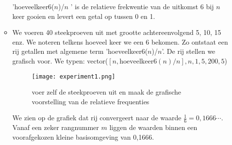 \begin{small}
\begin{itemize}
\begin{itemize}
'hoeveelkeer6($n$)/$n$ ' is de relatieve frekwentie van de uitkomst 6 bij $n$ keer gooien en levert een getal op tussen 0 en 1.
\item We voeren 40 steekproeven uit met grootte achtereenvolgend 5, 10, 15 enz. We noteren telkens hoeveel keer we een 6 bekomen. Zo ontstaat een rij getallen met algemene term 'hoeveelkeer6($n$)/$n$'. De rij stellen we grafisch voor.
We typen:
\bderive vector($[n,\mbox{hoeveelkeer}6(n)/n],n,1,5,200,5$)\ederive 
\begin{figure}[h]
\begin{center}
\texttt{[image: experiment1.png]}
\parbox{\textwidth}{\caption{voer zelf de steekproeven uit en maak de grafische voorstelling van de relatieve frequenties}}
\end{center}
\end{figure}
We zien op de grafiek dat rij convergeert naar de waarde $\frac{1}{6}=0,1666\cdots$. Vanaf een zeker rangnummer $m$ liggen de waarden binnen een voorafgekozen kleine basisomgeving van 0,1666.\\

\end{itemize}


\end{itemize}
\end{small}
